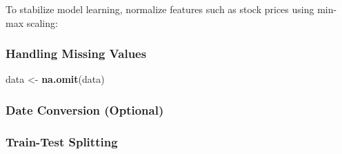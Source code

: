 \documentclass[
]{article}
\newenvironment{Shaded}{\begin{snugshade}}{\end{snugshade}}
\newcommand{\FunctionTok}[1]{\textcolor[rgb]{0.13,0.29,0.53}{\textbf{#1}}}
\newcommand{\NormalTok}[1]{#1}
\newcommand{\OtherTok}[1]{\textcolor[rgb]{0.56,0.35,0.01}{#1}}
\newcommand{\SpecialCharTok}[1]{\textcolor[rgb]{0.81,0.36,0.00}{\textbf{#1}}}
\begin{document}
To stabilize model learning, normalize features such as stock prices
using min-max scaling:

\begin{Shaded}
\end{Shaded}

\subsubsection{\texorpdfstring{\textbf{Handling Missing
Values}}{Handling Missing Values}}\label{handling-missing-values}

\begin{Shaded}
\begin{Highlighting}[]
\NormalTok{data }\OtherTok{\textless{}{-}} \FunctionTok{na.omit}\NormalTok{(data)}
\end{Highlighting}
\end{Shaded}

\subsubsection{Date Conversion
(Optional)}\label{date-conversion-optional}

\begin{Shaded}
\end{Shaded}

\subsubsection{Train-Test Splitting}\label{train-test-splitting}
\end{document}
